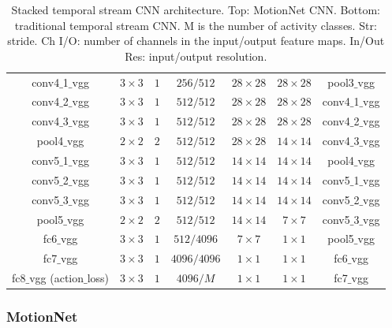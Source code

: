 \documentclass[sigconf]{acmart}
\begin{document}
\begin{table}[t]
\begin{center}
{\begin{tabular}{ | c | c | c | c | c | c |  c |}
					conv4$\_$1$\_$vgg & $3\times3$ & $1$ & $256/512$ & $28\times28$ & $28\times28$ & pool3$\_$vgg \\
					conv4$\_$2$\_$vgg & $3\times3$ & $1$ & $512/512$ & $28\times28$ & $28\times28$ & conv4$\_$1$\_$vgg \\
					conv4$\_$3$\_$vgg & $3\times3$ & $1$ & $512/512$ & $28\times28$ & $28\times28$ & conv4$\_$2$\_$vgg \\
					pool4$\_$vgg & $2\times2$ & $2$ & $512/512$ & $28\times28$ & $14\times14$ & conv4$\_$3$\_$vgg \\
					conv5$\_$1$\_$vgg & $3\times3$ & $1$ & $512/512$ & $14\times14$ & $14\times14$ & pool4$\_$vgg \\
					conv5$\_$2$\_$vgg & $3\times3$ & $1$ & $512/512$ & $14\times14$ & $14\times14$ & conv5$\_$1$\_$vgg \\
					conv5$\_$3$\_$vgg & $3\times3$ & $1$ & $512/512$ & $14\times14$ & $14\times14$ & conv5$\_$2$\_$vgg \\
					pool5$\_$vgg & $2\times2$ & $2$ & $512/512$ & $14\times14$ & $7\times7$ & conv5$\_$3$\_$vgg \\
					fc6$\_$vgg & $3\times3$ & $1$ & $512/4096$ & $7\times7$ & $1\times1$ & pool5$\_$vgg \\
					fc7$\_$vgg & $3\times3$ & $1$ & $4096/4096$ & $1\times1$ & $1\times1$ & fc6$\_$vgg \\
					fc8$\_$vgg (action$\_$loss) & $3\times3$ & $1$ & $4096/M$ & $1\times1$ & $1\times1$ & fc7$\_$vgg \\
					\hline
				\end{tabular}
			} 
			\vspace{2ex}
			\caption{Stacked temporal stream CNN architecture. Top: MotionNet CNN. Bottom: traditional temporal stream CNN. M is the number of activity classes. Str: stride. Ch I/O: number of channels in the input/output feature maps. In/Out Res: input/output resolution.  \label{tab:stacked_model}}
			\vspace{-6ex}
		\end{center}
	\end{table} 
	
	\subsubsection{\textbf{MotionNet}}
	\label{sec:motionnet}
	
\end{document}

